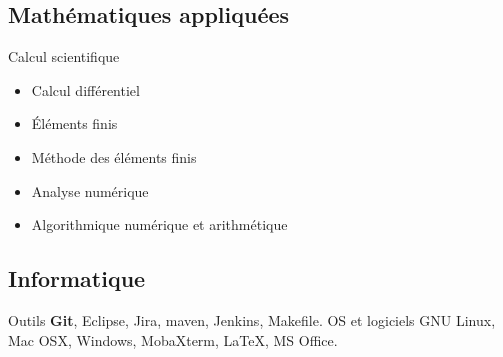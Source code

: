 \documentclass[10pt,a4paper,sans]{moderncv}%
\begin{document}
\subsection{Mathématiques appliquées}
{Calcul scientifique}{
    \begin{itemize}
        \item Calcul différentiel
        \item Éléments finis
        \item Méthode des éléments finis
        \item Analyse numérique
        \item Algorithmique numérique et arithmétique
    \end{itemize}
}

\subsection{Informatique}
{Outils}{
    \textbf{Git},
    Eclipse,
    Jira,
    \newline
    maven,
    Jenkins,
    Makefile.
}
{OS et logiciels}{
    GNU Linux,
    Mac OSX,
    Windows,
    \newline
    MobaXterm,
    \LaTeX,
    MS Office.
}
\end{document}
